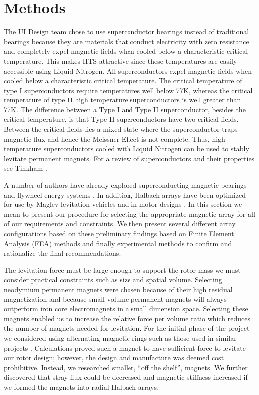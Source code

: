 \section{Methods}
The UI Design team chose to use superconductor bearings instead of traditional bearings because they are materials that conduct electricity with zero resistance and completely expel magnetic fields when cooled below a characteristic critical temperature. This makes HTS attractive since these temperatures are easily accessible using Liquid Nitrogen. All superconductors expel magnetic fields when cooled below a characteristic critical temperature. The critical temperature of type I superconductors require temperatures well below 77K, whereas the critical temperature of type II high temperature superconductors is well greater than 77K. The difference between a Type I and Type II superconductor, besides the critical temperature, is that Type II superconductors have two critical fields.  Between the critical fields lies a mixed-state where the superconductor traps magnetic flux and hence the Meissner Effect is not complete.  Thus, high temperature superconductors cooled with Liquid Nitrogen can be used to stably levitate permanent magnets. For a review of superconductors and their properties see Tinkham \cite{tinkham}.

 A number of authors have already explored superconducting magnetic bearings and flywheel energy systems \cite{xia, miyazakim, cansiz, sung, nagashima, werfel, coombs002, ma, mulcahy1, turner, ikedia}.  In addition, Halbach arrays have been optimized for use by Maglev levitation vehicles \cite{Jing, deng, zhang, del2, liu, deng2} and in motor designs \cite{turner, soltner, robertson, wang}.  In this section we mean to present our procedure for selecting the appropriate magnetic array for all of our requirements and constraints.  We then present several different array configurations based on these preliminary findings based on Finite Element Analysis (FEA) methods and finally experimental methods to confirm and rationalize the final recommendations.

The levitation force must be large enough to support the rotor mass we must consider practical constraints such as size and spatial volume.  Selecting neodymium permanent magnets were chosen because of their high residual magnetization and because  small volume permanent magnets will always outperform iron core electromagnets in a small dimension space\cite{hawkins}. Selecting these magnets enabled us to increase the relative force per volume ratio which reduces the number of magnets needed for levitation.  For the initial phase of the project we considered using alternating magnetic rings such as those used in similar projects \cite{strasik, sotelo1}.  Calculations proved such a magnet to have sufficient force to levitate our rotor design; however, the design and manufacture was deemed cost prohibitive.  Instead, we researched smaller, “off the shelf”, magnets.  We further discovered that stray flux could be decreased and magnetic stiffness increased if we formed the magnets into radial Halbach arrays.  

